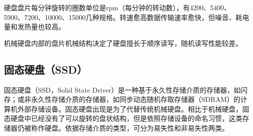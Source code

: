 硬盘盘片每分钟旋转的圈数单位是rpm（每分钟的转动数），有4200、5400、5900、7200、10000、15000几种规格。转速愈高数据传输速率愈快，但噪音、耗电量和发热量也较高。

机械硬盘内部的盘片机械结构决定了硬盘擅长于顺序读写，随机读写性能较差。

\subsection{固态硬盘（SSD）}
固态硬盘（SSD，Solid State Driver）是一种基于永久性存储介质的存储器，如闪存；或非永久性存储介质的存储器，如同步动态随机存取存储器（SDRAM）的计算机外部存储设备。固态硬盘出现是为了代替传统机械硬盘。相比于机械硬盘，固态硬盘中已经没有了可以旋转的盘状结构，但是依照存储设备的命名习惯，这类存储器仍被称作硬盘。依据存储介质的类型，可分为易失性和非易失性两类。

